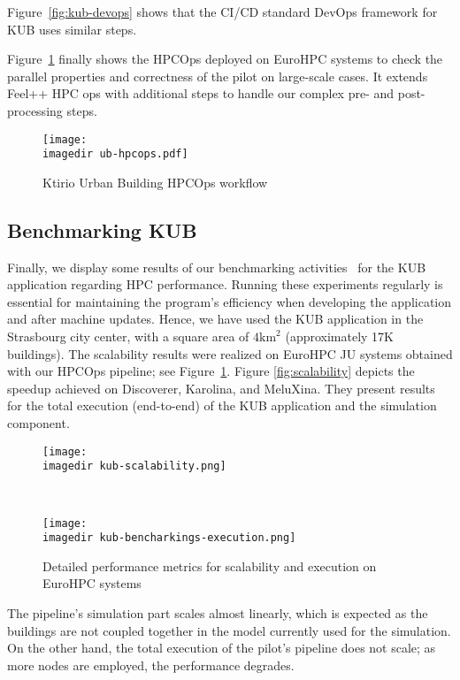 \documentclass[runningheads]{llncs}
\newcommand{\imagedir}{./} %
\begin{document}
Figure~\ref{fig:kub-devops} shows that the CI/CD standard DevOps framework for KUB uses similar steps.



Figure~\ref{fig:kub-hpcops} finally shows the HPCOps deployed on EuroHPC systems to check the parallel properties and correctness of the pilot on large-scale cases. It extends Feel++ HPC ops with additional steps to handle our complex pre- and post-processing steps.

\begin{figure}
    \centering
    \texttt{[image: \\imagedir ub-hpcops.pdf]}
    \caption{Ktirio Urban Building HPCOps workflow}
    \label{fig:kub-hpcops}
\end{figure}

\subsection{Benchmarking KUB}

Finally, we display some results of our benchmarking activities~\cite{hidalgo2_d31_2024} for the KUB application regarding HPC performance. Running these experiments regularly is essential for maintaining the program's efficiency when developing the application and after machine updates. 
Hence, we have used the KUB application in the Strasbourg city center, with a square area of $4 \mathrm{km}^2$ (approximately 17K buildings). The scalability results were realized on EuroHPC JU systems obtained with our HPCOps pipeline; see Figure~\ref{fig:kub-hpcops}. Figure \ref{fig:scalability} depicts the speedup achieved on Discoverer, Karolina, and MeluXina. They present results for the total execution (end-to-end) of the KUB application and the simulation component.

\begin{wrapfigure}{R}{0.6\textwidth}  %
  \centering
  \begin{subfloat}{
    \texttt{[image: \\imagedir kub-scalability.png]}
    \label{fig:scalability}
  }\end{subfloat}
  \\
  \begin{subfloat}{
    \texttt{[image: \\imagedir kub-bencharkings-execution.png]}
    \label{fig:execution-breakdown}
  }\end{subfloat}
  \caption{Detailed performance metrics for scalability and execution on EuroHPC systems}
  \label{fig:combined-metrics}
\end{wrapfigure}
The pipeline's simulation part scales almost linearly, which is expected as the buildings are not coupled together in the model currently used for the simulation. On the other hand, the total execution of the pilot's pipeline does not scale; as more nodes are employed, the performance degrades.
\end{document}

